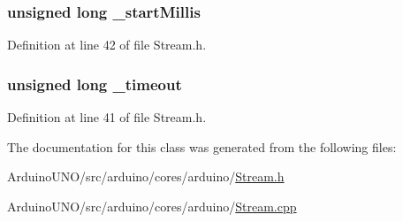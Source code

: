 \subsubsection[{\+\_\+start\+Millis}]{\setlength{\rightskip}{0pt plus 5cm}unsigned long \+\_\+start\+Millis\hspace{0.3cm}{\ttfamily [protected]}}\label{class_stream_a30515d765ff208be483b71592aa9da72}


Definition at line 42 of file Stream.\+h.

\hypertarget{class_stream_a24c7e4b09282e8150935ce8da759e176}{}
\subsubsection[{\+\_\+timeout}]{\setlength{\rightskip}{0pt plus 5cm}unsigned long \+\_\+timeout\hspace{0.3cm}{\ttfamily [protected]}}\label{class_stream_a24c7e4b09282e8150935ce8da759e176}


Definition at line 41 of file Stream.\+h.



The documentation for this class was generated from the following files\+:\begin{DoxyCompactItemize}
\item 
Arduino\+U\+N\+O/src/arduino/cores/arduino/\hyperlink{_stream_8h}{Stream.\+h}\item 
Arduino\+U\+N\+O/src/arduino/cores/arduino/\hyperlink{_stream_8cpp}{Stream.\+cpp}\end{DoxyCompactItemize}
